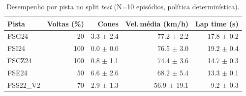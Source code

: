 \begin{table}[H]
\centering
\caption{Desempenho por pista no split \textit{test} (N=10 episódios, política determinística).}
\label{tab:per_track_test}
\begin{tabular}{lrrrr}
\toprule
\textbf{Pista} & \textbf{Voltas (\%)} & \textbf{Cones} & \textbf{Vel.\,m\'edia (km/h)} & \textbf{Lap time (s)} \\
\midrule
FSG24 & 20 & 3.3 $\pm$ 2.4 & 77.2 $\pm$ 2.2 & 17.8 $\pm$ 0.2 \\
FSI24 & 100 & 0.0 $\pm$ 0.0 & 76.5 $\pm$ 3.0 & 19.2 $\pm$ 0.4 \\
FSCZ24 & 100 & 0.8 $\pm$ 1.1 & 74.4 $\pm$ 3.6 & 14.7 $\pm$ 0.3 \\
FSE24 & 50 & 6.6 $\pm$ 2.6 & 68.2 $\pm$ 5.4 & 13.3 $\pm$ 0.1 \\
FSS22_V2 & 70 & 2.9 $\pm$ 1.3 & 56.9 $\pm$ 19.1 & 9.2 $\pm$ 0.3 \\
\bottomrule
\end{tabular}
\end{table}
